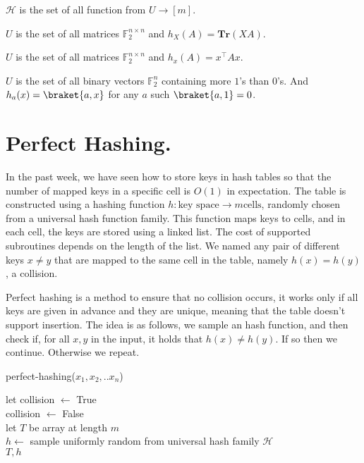 \begin{example}
  $\mathcal{H}$ is the set of all function from $U \rightarrow [m]$.
\end{example}

\begin{exercise}
  $U$ is the set of all matrices $\mathbb{F}_{2}^{n\times n}$ and $h_{X}(A) = \mathbf{Tr} \left(XA\right) $. 
\end{exercise}

\begin{exercise}
  $U$ is the set of all matrices $\mathbb{F}_{2}^{n\times n}$ and $h_{x}(A) = x^{\top} A x$. 
\end{exercise}

\begin{exercise}
  $U$ is the set of all binary vectors $\mathbb{F}_{2}^{n}$  containing more $1$'s than $0$'s. And $h_{a}(x) = \braket{a,x}$ for any $a$ such $\braket{a,1} = 0$. 
\end{exercise}
\section{Perfect Hashing.}
In the past week, we have seen how to store keys in hash tables so that the number of mapped keys in a specific cell is $O(1)$ in expectation. The table is constructed using a hashing function $h : \text{key space} \rightarrow m \text{cells}$, randomly chosen from a universal hash function family. This function maps keys to cells, and in each cell, the keys are stored using a linked list. The cost of supported subroutines depends on the length of the list. We named any pair of different keys $x\neq y$ that are mapped to the same cell in the table, namely $h(x) = h(y)$, a collision.

Perfect hashing is a method to ensure that no collision occurs, it works only if all keys are given in advance and they are unique, meaning that the table doesn't support insertion. The idea is as follows, we sample an hash function, and then check if, for all $x,y$ in the input, it holds that $h(x)\neq h(y)$. If so then we continue. Otherwise we repeat. 

  \begin{algorithm}
  \caption{perfect-hashing($x_{1},x_{2},..x_{n}$)}
  let collision $\leftarrow$ True\\
   {
    collision $\leftarrow$ False\\
    let $T$ be array at length $m$ \\
    $h \leftarrow $ sample uniformly random from universal hash family $\mathcal{H}$\\
  }
  \Return $T,h$
  \end{algorithm}

